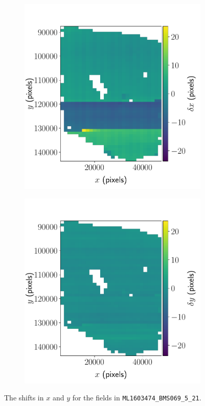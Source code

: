 \documentclass{article}
\begin{document}
\begin{figure}[ht]
	\centering
	\begin{subfigure}{0.49\linewidth}
		\includegraphics[width=\linewidth]{2D-shifts-BMS2-x}
		\caption{}
		\label{fig:2DBMSbadx}
	\end{subfigure}
	\begin{subfigure}{0.49\linewidth}
		\includegraphics[width=\linewidth]{2D-shifts-BMS2-y}
		\caption{}
		\label{fig:2DBMSbady}
	\end{subfigure}
	\caption{The shifts in  $x$ and  $y$ for the fields in \texttt{ML1603474\_BMS069\_5\_21}.}
	\label{fig:2DBMSbad}
\end{figure}
\end{document}
